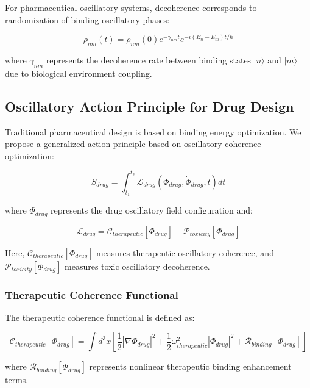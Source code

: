 \documentclass[12pt,a4paper]{article}
\begin{document}
For pharmaceutical oscillatory systems, decoherence corresponds to randomization of binding oscillatory phases:

\begin{equation}
\rho_{nm}(t) = \rho_{nm}(0) e^{-\gamma_{nm} t} e^{-i(E_n - E_m)t/\hbar}
\end{equation}

where $\gamma_{nm}$ represents the decoherence rate between binding states $|n\rangle$ and $|m\rangle$ due to biological environment coupling.

\subsection{Oscillatory Action Principle for Drug Design}

Traditional pharmaceutical design is based on binding energy optimization. We propose a generalized action principle based on oscillatory coherence optimization:

\begin{equation}
S_{drug} = \int_{t_1}^{t_2} \mathcal{L}_{drug}(\Phi_{drug}, \dot{\Phi}_{drug}, t) dt
\end{equation}

where $\Phi_{drug}$ represents the drug oscillatory field configuration and:

\begin{equation}
\mathcal{L}_{drug} = \mathcal{C}_{therapeutic}[\Phi_{drug}] - \mathcal{P}_{toxicity}[\Phi_{drug}]
\end{equation}

Here, $\mathcal{C}_{therapeutic}[\Phi_{drug}]$ measures therapeutic oscillatory coherence, and $\mathcal{P}_{toxicity}[\Phi_{drug}]$ measures toxic oscillatory decoherence.

\subsubsection{Therapeutic Coherence Functional}

The therapeutic coherence functional is defined as:

\begin{equation}
\mathcal{C}_{therapeutic}[\Phi_{drug}] = \int d^3x \left[\frac{1}{2}|\nabla\Phi_{drug}|^2 + \frac{1}{2}\omega_{therapeutic}^2|\Phi_{drug}|^2 + \mathcal{R}_{binding}[\Phi_{drug}]\right]
\end{equation}

where $\mathcal{R}_{binding}[\Phi_{drug}]$ represents nonlinear therapeutic binding enhancement terms.
\end{document}
